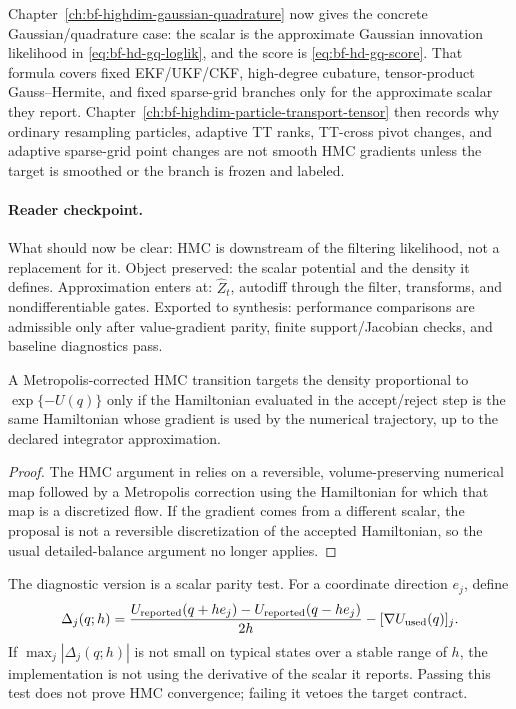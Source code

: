 Chapter~\ref{ch:bf-highdim-gaussian-quadrature} now gives the concrete
Gaussian/quadrature case: the scalar is the approximate Gaussian innovation
likelihood in \eqref{eq:bf-hd-gq-loglik}, and the score is
\eqref{eq:bf-hd-gq-score}.  That formula covers fixed EKF/UKF/CKF,
high-degree cubature, tensor-product Gauss--Hermite, and fixed sparse-grid
branches only for the approximate scalar they report.  Chapter~\ref{ch:bf-highdim-particle-transport-tensor}
then records why ordinary resampling particles, adaptive TT ranks, TT-cross
pivot changes, and adaptive sparse-grid point changes are not smooth HMC
gradients unless the target is smoothed or the branch is frozen and labeled.

\paragraph{Reader checkpoint.}
What should now be clear: HMC is downstream of the filtering likelihood, not a
replacement for it.  Object preserved: the scalar potential and the density it
defines.  Approximation enters at: \(\widehat Z_t\), autodiff through the
filter, transforms, and nondifferentiable gates.  Exported to synthesis:
performance comparisons are admissible only after value-gradient parity,
finite support/Jacobian checks, and baseline diagnostics pass.

\begin{proposition}
\label{prop:bf-hd-same-scalar}
A Metropolis-corrected HMC transition targets the density proportional to
$\exp\{-U(q)\}$ only if the Hamiltonian evaluated in the accept/reject step is
the same Hamiltonian whose gradient is used by the numerical trajectory, up to
the declared integrator approximation.
\end{proposition}

\begin{proof}
The HMC argument in \citet{neal2011mcmc} relies on a reversible,
volume-preserving numerical map followed by a Metropolis correction using the
Hamiltonian for which that map is a discretized flow.  If the gradient comes
from a different scalar, the proposal is not a reversible discretization of the
accepted Hamiltonian, so the usual detailed-balance argument no longer applies.
\end{proof}

The diagnostic version is a scalar parity test.  For a coordinate direction
\(e_j\), define
\[
  \Delta_j(q;h)=
  \frac{U_{\rm reported}(q+h e_j)-U_{\rm reported}(q-h e_j)}{2h}
  -[\nabla U_{\rm used}(q)]_j .
\]
If \(\max_j|\Delta_j(q;h)|\) is not small on typical states over a stable range
of \(h\), the implementation is not using the derivative of the scalar it
reports.  Passing this test does not prove HMC convergence; failing it vetoes
the target contract.

